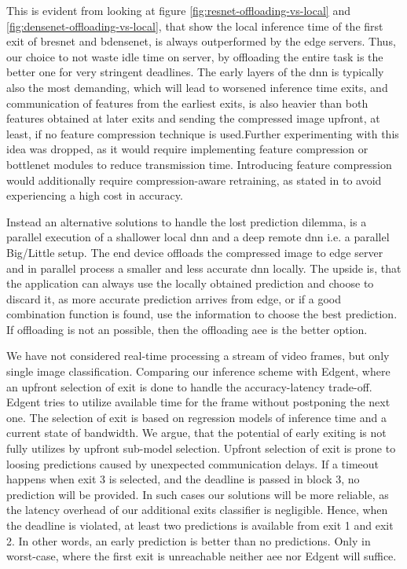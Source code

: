 This is evident from looking at figure \ref{fig:resnet-offloading-vs-local} and \ref{fig:densenet-offloading-vs-local}, that show the local inference time of the first exit of \gls{bresnet} and \gls{bdensenet}, is always outperformed by the edge servers. Thus, our choice to not waste idle time on server, by offloading the entire task is the better one for very stringent deadlines. The early layers of the \gls{dnn} is typically also the most demanding, which will lead to worsened inference time exits, and communication of features from the earliest exits, is also heavier than both features obtained at later exits and sending the compressed image upfront, at least, if no feature compression technique is used.Further experimenting with this idea was dropped, as it would require implementing feature compression or \gls{bottlenet} modules to reduce transmission time. Introducing feature compression would additionally require compression-aware retraining, as stated in \cite{choi_near-lossless_2018,choi_near-lossless_2018,eshratifar_bottlenet:_2019}  to avoid experiencing a high cost in accuracy.

Instead an alternative solutions to handle the lost prediction dilemma, is a parallel execution of a shallower local \gls{dnn} and a deep remote \gls{dnn} i.e. a parallel Big/Little setup. The end device offloads the compressed image to edge server and in parallel process a smaller and less accurate \gls{dnn} locally. The upside is, that the application can always use the locally obtained prediction and choose to discard it, as more accurate prediction arrives from edge, or if a good combination function is found, use the information to choose the best prediction. If offloading is not an possible, then the offloading \gls{aee} is the better option.

We have not considered real-time processing a stream of video frames, but only single image classification. Comparing our inference scheme with Edgent, where an upfront selection of exit is done to handle the accuracy-latency trade-off. Edgent tries to utilize available time for the frame without postponing the next one. The selection of exit is based on regression models of inference time and a current state of bandwidth.  We argue, that the potential of early exiting is not fully utilizes by upfront sub-model selection. Upfront selection of exit is prone to loosing predictions caused by unexpected communication delays. If a timeout happens when exit 3 is selected, and the deadline is passed in block 3, no prediction will be provided.  In such cases our solutions will be more reliable, as the latency overhead of our additional exits classifier is negligible. Hence, when the deadline is violated, at least two predictions is available from exit 1 and exit 2. In other words, an early prediction is better than no predictions. Only in worst-case, where the first exit is unreachable neither \gls{aee} nor Edgent will suffice. 

